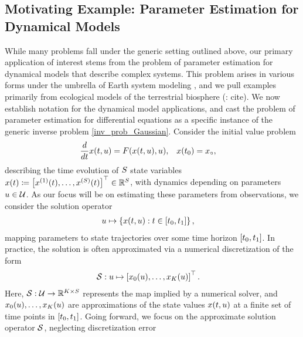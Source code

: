 \documentclass[12pt]{article}
\begin{document}
\subsection{Motivating Example: Parameter Estimation for Dynamical Models} \label{dynamical_models}
While many problems fall under the generic setting outlined above, our primary application of interest 
stems from the problem of parameter estimation for dynamical models that describe complex systems. 
This problem arises in various forms under the umbrella of Earth system modeling \citep{ESM_modeling_2pt0}, 
and we pull examples primarily from ecological models of the terrestrial biosphere (\todo: cite). We now 
establish notation for the dynamical model applications, and cast the problem of parameter estimation for 
differential equations as a specific instance of the generic inverse problem \ref{inv_prob_Gaussian}. 
Consider the initial value problem 
\begin{align}
\frac{d}{d\Time} \state(\Time, \Par) &= \odeRHS(\state(\Time, \Par), \Par), &&x(\timeStart) = \stateIC, \label{ode_ivp}
\end{align}
describing the time evolution of $\dimState$ state variables 
$\state(\Time) \Def \left[\indexState[1]{\state}(\Time), \dots, \indexState[\dimState]{\state}(\Time)\right]^\top \in \mathbb{R}^{\dimState}$,
with dynamics depending on parameters $\Par \in \parSpace$. As our focus will be on estimating these parameters 
from observations, we consider the solution operator 
\begin{align}
\Par &\mapsto \left\{\state(\Time, \Par) :  \Time \in [\timeStart, \timeEnd] \right\}, 
\end{align}
mapping parameters to state trajectories over some time horizon $[\timeStart, \timeEnd]$. In practice, the solution 
is often approximated via a numerical discretization of the form 
\begin{align}
\solutionOp: \Par &\mapsto \left[\indexTime[0]{\state}(\Par), \dots, \indexTime[\NTimeStep]{\state}(\Par) \right]^\top. 
\end{align}
Here, $\solutionOp: \parSpace \to \R^{\NTimeStep \times \dimState}$ represents the map implied by a numerical solver, 
and $\indexTime[0]{\state}(\Par), \dots, \indexTime[\NTimeStep]{\state}(\Par)$ are approximations of the state 
values $\state(\Time, \Par)$ at a finite set of time points in $[\timeStart, \timeEnd]$. 
Going forward, we focus on the approximate solution operator $\solutionOp$, neglecting discretization error 
\end{document}

